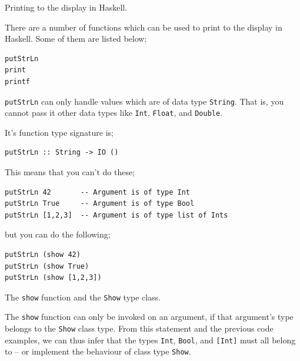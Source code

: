 
\begin{frame}[t, fragile]{Printing to the display in Haskell.}

There are a number of functions which can be used to print to the display in Haskell. Some of them are listed below;

\begin{verbatim}
putStrLn
print
printf
\end{verbatim}

\texttt{putStrLn} can only handle values which are of data type \texttt{String}. That is, you
cannot pass it other data types like \texttt{Int}, \texttt{Float}, and
\texttt{Double}.

It's function type signature is;

\begin{verbatim}
putStrLn :: String -> IO ()
\end{verbatim}

This means that you can't do these;

\begin{verbatim}
putStrLn 42       -- Argument is of type Int
putStrLn True     -- Argument is of type Bool
putStrLn [1,2,3]  -- Argument is of type list of Ints
\end{verbatim}

but you can do the following;

\begin{verbatim}
putStrLn (show 42)
putStrLn (show True)
putStrLn (show [1,2,3])
\end{verbatim}

\end{frame}


\begin{frame}[t, fragile]{The \texttt{show} function and the \texttt{Show} type class.}

The \texttt{show} function can only be invoked on an argument, if that argument's type belongs to the \texttt{Show} class type. From this statement and the previous code examples, we can thus infer that the types \texttt{Int}, \texttt{Bool}, and \texttt{[Int]} must all belong to -- or implement the behaviour of class type \texttt{Show}.

\end{frame}


